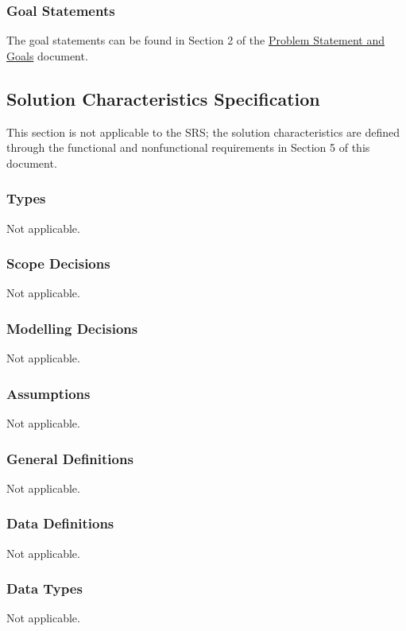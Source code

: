 \documentclass[12pt]{article}
\begin{document}
\subsubsection{Goal Statements}

The goal statements can be found in Section 2 of the
\href{https://github.com/PlutosCapstone/Plutos/blob/main/docs/ProblemStatementAndGoals/ProblemStatement.pdf}{Problem
Statement and Goals} document.

\newpage


\subsection{Solution Characteristics Specification}
This section is not applicable to the SRS; the solution characteristics are
defined through the functional and nonfunctional requirements in Section 5 of
this document.

\subsubsection{Types}
Not applicable.

\subsubsection{Scope Decisions}
Not applicable.

\subsubsection{Modelling Decisions}
Not applicable.

\subsubsection{Assumptions} \label{sec_assumpt} Not applicable.

\subsubsection{General Definitions}\label{sec_gendef} Not applicable.

\subsubsection{Data Definitions}\label{sec_datadef} Not applicable.

\subsubsection{Data Types}\label{sec_datatypes} Not applicable.
\end{document}

